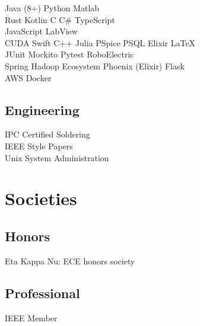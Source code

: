 \documentclass[letterpaper]{deedy-resume-openfont} %
\begin{document}
\begin{minipage}[t]{0.33\textwidth}
 Java (8+) \textbullet{} Python \textbullet{} Matlab  \\
Rust \textbullet{}  Kotlin \textbullet{}  C \textbullet{}  C\# \textbullet{} TypeScript \\
 JavaScript\textbullet{} LabView\\
CUDA  \textbullet{} Swift \textbullet{} C++ \textbullet{} Julia \textbullet{} PSpice  \textbullet{} PSQL \textbullet{} Elixir \textbullet{} \LaTeX \\
JUnit \textbullet{} Mockito \textbullet{} Pytest \textbullet{} RoboElectric \\
Spring \textbullet{} Hadoop Ecosystem \textbullet{} Phoenix (Elixir) \textbullet{} Flask\\
AWS\textbullet{} Docker


\sectionspace %

\subsection{Engineering}
IPC Certified Soldering \\
IEEE Style Papers \\
Unix System  Administration

\section{Societies}
\subsection{Honors}
 Eta Kappa Nu: ECE honors society \\
\subsection{Professional}
IEEE Member

\sectionspace %

\end{minipage} %
\hfill
%
\end{document}
